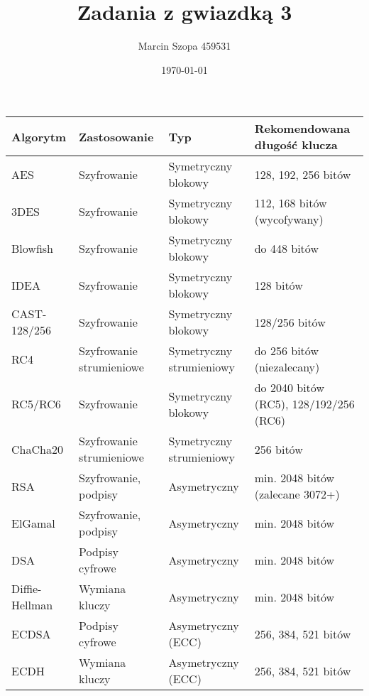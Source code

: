 \documentclass{article}
\title{Zadania z gwiazdką 3}
\author{Marcin Szopa 459531}
\date{\today}
\theoremstyle{definition}
\theoremstyle{remark}
\begin{document}
\begin{table}[ht]
    \centering
    \begin{tabular}{|l|l|l|l|}
        \hline
        \textbf{Algorytm}       & \textbf{Zastosowanie}    & \textbf{Typ}             & \textbf{Rekomendowana długość klucza}  \\
        \hline
        AES                     & Szyfrowanie              & Symetryczny blokowy      & 128, 192, 256 bitów                    \\
        3DES                    & Szyfrowanie              & Symetryczny blokowy      & 112, 168 bitów (wycofywany)            \\
        Blowfish                & Szyfrowanie              & Symetryczny blokowy      & do 448 bitów                           \\
        IDEA                    & Szyfrowanie              & Symetryczny blokowy      & 128 bitów                              \\
        CAST-128/256            & Szyfrowanie              & Symetryczny blokowy      & 128/256 bitów                          \\
        RC4                     & Szyfrowanie strumieniowe & Symetryczny strumieniowy & do 256 bitów (niezalecany)             \\
        RC5/RC6                 & Szyfrowanie              & Symetryczny blokowy      & do 2040 bitów (RC5), 128/192/256 (RC6) \\
        ChaCha20                & Szyfrowanie strumieniowe & Symetryczny strumieniowy & 256 bitów                              \\
        \hline
        RSA                     & Szyfrowanie, podpisy     & Asymetryczny             & min. 2048 bitów (zalecane 3072+)       \\
        ElGamal                 & Szyfrowanie, podpisy     & Asymetryczny             & min. 2048 bitów                        \\
        DSA                     & Podpisy cyfrowe          & Asymetryczny             & min. 2048 bitów                        \\
        Diffie-Hellman          & Wymiana kluczy           & Asymetryczny             & min. 2048 bitów                        \\
        ECDSA                   & Podpisy cyfrowe          & Asymetryczny (ECC)       & 256, 384, 521 bitów                    \\
        ECDH                    & Wymiana kluczy           & Asymetryczny (ECC)       & 256, 384, 521 bitów                    \\

\end{tabular}
\end{table}
\end{document}
